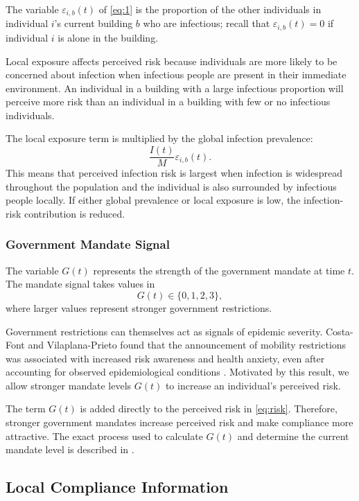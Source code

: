 \documentclass[11pt]{article}
\theoremstyle{definition}
\theoremstyle{plain}
\begin{document}
The variable $\varepsilon_{i,b}(t)$ of \eqref{eq:1} is the proportion of the other individuals in individual $i$'s current building $b$ who are infectious; recall that $\varepsilon_{i,b}(t)=0$ if individual $i$ is alone in the building.

Local exposure affects perceived risk because individuals are more likely to be concerned about infection when infectious people are present in their immediate environment. An individual in a building with a large infectious proportion will perceive more risk than an individual in a building with few or no infectious individuals.

The local exposure term is multiplied by the global infection prevalence:
\[
\frac{I(t)}{M}\varepsilon_{i,b}(t).
\]
This means that perceived infection risk is largest when infection is widespread throughout the population and the individual is also surrounded by infectious people locally. If either global prevalence or local exposure is low, the infection-risk contribution is reduced.

\subsubsection{Government Mandate Signal}

The variable $G(t)$ represents the strength of the government mandate at time $t$. The mandate signal takes values in
\[
G(t)\in\{0,1,2,3\},
\]
where larger values represent stronger government restrictions.

Government restrictions can themselves act as signals of epidemic severity.
Costa-Font and Vilaplana-Prieto found that the announcement of mobility
restrictions was associated with increased risk awareness and health anxiety,
even after accounting for observed epidemiological conditions
\cite{costafont2022}. Motivated by this result, we allow stronger mandate
levels $G(t)$ to increase an individual's perceived risk.

The term $G(t)$ is added directly to the perceived risk in \eqref{eq:risk}. Therefore, stronger government mandates increase perceived risk and make compliance more attractive. The exact process used to calculate $G(t)$ and determine the current mandate level is described in .

\subsection{Local Compliance Information}
\label{sec:peer}
\end{document}
